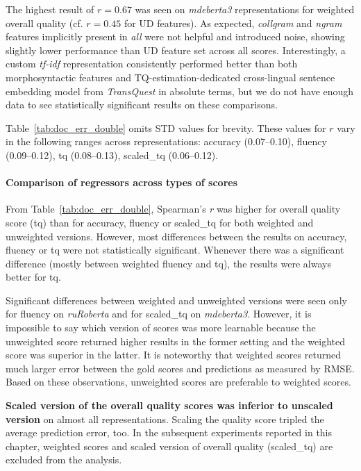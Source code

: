 The highest result of $r=0.67$ was seen on \textit{mdeberta3} representations for weighted overall quality (cf. $r=0.45$ for UD features). %
As expected, \textit{collgram} and \textit{ngram} features implicitly present in \textit{all} were not helpful and introduced noise, showing slightly lower performance than UD feature set across all scores. 
Interestingly, a custom \textit{tf-idf} representation consistently performed better than both morphosyntactic features and TQ-estimation-dedicated cross-lingual sentence embedding model from \textit{TransQuest} in absolute terms, but we do not have enough data to see statistically significant results on these comparisons.

Table~\ref{tab:doc_err_double} omits STD values for brevity. These values for $r$ vary in the following ranges across representations: accuracy (0.07--0.10), fluency (0.09--0.12), tq (0.08--0.13), scaled\_tq (0.06--0.12).

\paragraph{Comparison of regressors across types of scores}
From Table~\ref{tab:doc_err_double}, Spearman's \textit{r} was higher for overall quality score (tq) than for accuracy, fluency or scaled\_tq for both weighted and unweighted versions. However, most differences between the results on accuracy, fluency or tq were not statistically significant. Whenever there was a significant difference (mostly between weighted fluency and tq), the results were always better for tq.

Significant differences between weighted and unweighted versions were seen only for fluency on \textit{ruRoberta} and for scaled\_tq on \textit{mdeberta3}. However, it is impossible to say which version of scores was more learnable because the unweighted score returned higher results in the former setting and the weighted score was superior in the latter. 
It is noteworthy that weighted scores returned much larger error between the gold scores and predictions as measured by \gls*{RMSE}. 
Based on these observations, {unweighted scores are preferable to weighted scores}.

\textbf{Scaled version of the overall quality scores was inferior to unscaled version} on almost all representations. %
Scaling the quality score tripled the average prediction error, too.
In the subsequent experiments reported in this chapter, weighted scores and scaled version of overall quality (scaled\_tq) are excluded from the analysis.

